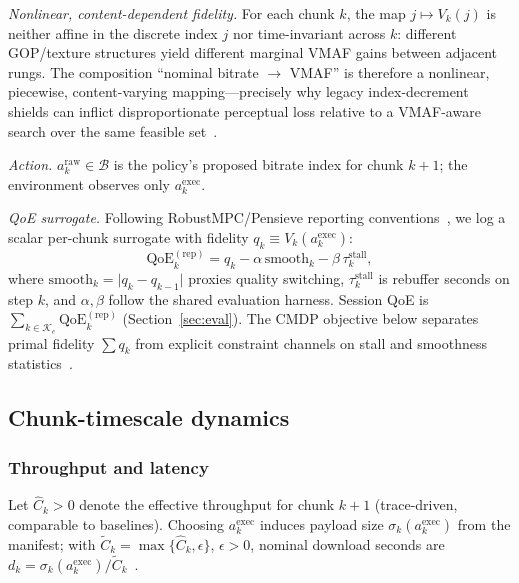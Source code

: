 \documentclass[preprint,12pt,times]{elsarticle}
\begin{document}
\emph{Nonlinear, content-dependent fidelity.}
For each chunk \(k\), the map \(j\mapsto V_k(j)\) is neither affine in the discrete index \(j\) nor time-invariant across \(k\): different GOP/texture structures yield different marginal VMAF gains between adjacent rungs.
The composition ``nominal bitrate \(\rightarrow\) VMAF'' is therefore a nonlinear, piecewise, content-varying mapping---precisely why legacy index-decrement shields can inflict disproportionate perceptual loss relative to a VMAF-aware search over the same feasible set~\cite{li2016vmaf}.

\emph{Action.}
\(a^{\mathrm{raw}}_k\in\mathcal{B}\) is the policy's proposed bitrate index for chunk \(k{+}1\); the environment observes only \(a^{\mathrm{exec}}_k\).

\emph{QoE surrogate.}
Following RobustMPC/Pensieve reporting conventions~\cite{yin2015control,mao2017neural}, we log a scalar per-chunk surrogate with fidelity \(q_k \equiv V_k\!\left(a^{\mathrm{exec}}_k\right)\):
\begin{equation}
\label{eq:qoe-rep}
    \mathrm{QoE}^{\mathrm{(rep)}}_{k} = q_k - \alpha\, \mathrm{smooth}_k - \beta\, \tau^{\mathrm{stall}}_k,
\end{equation}
where \(\mathrm{smooth}_k=\lvert q_k-q_{k-1}\rvert\) proxies quality switching, \(\tau^{\mathrm{stall}}_k\) is rebuffer seconds on step \(k\), and \(\alpha,\beta\) follow the shared evaluation harness.
Session QoE is \(\sum_{k\in\mathcal{K}_e}\mathrm{QoE}^{\mathrm{(rep)}}_{k}\) (Section~\ref{sec:eval}).
The CMDP objective below separates primal fidelity \(\sum q_k\) from explicit constraint channels on stall and smoothness statistics~\cite{altman1999constrained,paternain2019dual}.

\subsection{Chunk-timescale dynamics}

\subsubsection{Throughput and latency}
Let \(\hat{C}_k>0\) denote the effective throughput for chunk \(k{+}1\) (trace-driven, comparable to baselines).
Choosing \(a^{\mathrm{exec}}_k\) induces payload size \(\sigma_{k}(a^{\mathrm{exec}}_k)\) from the manifest; with \(\tilde{C}_k=\max\{\hat{C}_k,\epsilon\}\), \(\epsilon{>}0\), nominal download seconds are \(d_k=\sigma_{k}(a^{\mathrm{exec}}_k)/\tilde{C}_k\)~\cite{yin2015control}.
\end{document}
